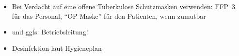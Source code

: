 \label{m:tuberkulose}
\begin{itemize}
  \item Bei Verdacht auf eine offene Tuberkulose
  Schutzmasken verwenden: FFP~3 für das Personal, \enquote{OP-Maske} für den
  Patienten, wenn zumutbar
  \item {} und ggfs. Betriebsleitung!
  \item Desinfektion laut Hygieneplan
\end{itemize}
